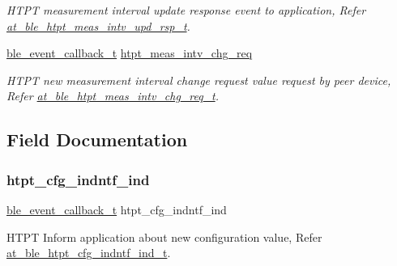 \begin{DoxyCompactItemize}
\begin{DoxyCompactList}\small\item\em H\+T\+PT measurement interval update response event to application, Refer \mbox{\hyperlink{structat__ble__htpt__meas__intv__upd__rsp__t}{at\+\_\+ble\+\_\+htpt\+\_\+meas\+\_\+intv\+\_\+upd\+\_\+rsp\+\_\+t}}. \end{DoxyCompactList}\item 
\mbox{\hyperlink{ble__manager_8h_a04ce4bb8cb8282f2762e3924b1773cc9}{ble\+\_\+event\+\_\+callback\+\_\+t}} \mbox{\hyperlink{structble__htpt__event__cb_aecb6eed49dbeab4e1d4a10df39937fc4}{htpt\+\_\+meas\+\_\+intv\+\_\+chg\+\_\+req}}
\begin{DoxyCompactList}\small\item\em H\+T\+PT new measurement interval change request value request by peer device, Refer \mbox{\hyperlink{structat__ble__htpt__meas__intv__chg__req__t}{at\+\_\+ble\+\_\+htpt\+\_\+meas\+\_\+intv\+\_\+chg\+\_\+req\+\_\+t}}. \end{DoxyCompactList}\end{DoxyCompactItemize}


\subsection{Field Documentation}
\mbox{\label{structble__htpt__event__cb_a0fe32b260da73923ae2cb8076c4d7ccf}} 
\subsubsection{\texorpdfstring{htpt\_cfg\_indntf\_ind}{htpt\_cfg\_indntf\_ind}}
{\footnotesize\ttfamily \mbox{\hyperlink{ble__manager_8h_a04ce4bb8cb8282f2762e3924b1773cc9}{ble\+\_\+event\+\_\+callback\+\_\+t}} htpt\+\_\+cfg\+\_\+indntf\+\_\+ind}



H\+T\+PT Inform application about new configuration value, Refer \mbox{\hyperlink{structat__ble__htpt__cfg__indntf__ind__t}{at\+\_\+ble\+\_\+htpt\+\_\+cfg\+\_\+indntf\+\_\+ind\+\_\+t}}. 

\mbox{\label{structble__htpt__event__cb_acadc78bb10239b5a8dec6e07586642ba}} 
